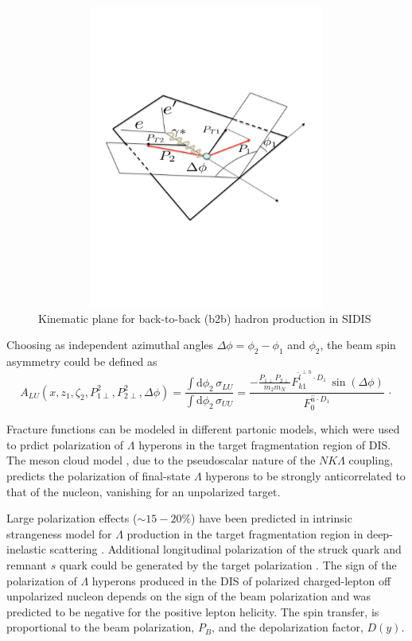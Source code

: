 \documentclass[11pt,a4paper]{article}
\newcommand{\be}{\begin{equation}}
\newcommand{\ee}{\end{equation}}
\newcommand{\D}{\mathrm{d}}
\begin{document}
\begin{figure}
\centering
\includegraphics[width=16cm,height=10cm,keepaspectratio]{plots/b2bkin.pdf}
   \caption{Kinematic plane for back-to-back (b2b) hadron production in SIDIS}
 \label{fig:b2b}
 \end{figure} 


Choosing as independent azimuthal angles $\Delta \phi=\phi_2-\phi_1$ and $\phi_2$, the beam spin asymmetry could be defined as
\be
A_{LU}(x, z_1, \zeta_2, P_{1\perp}^2,  P_{2\perp}^2, \Delta \phi) =
\frac{\int \D \phi_2 \, \sigma_{LU}}{\int \D \phi_2 \, \sigma_{UU}}=
\frac{-\frac{ P_{{1\perp}} P_{{2\perp}}}{m_2 m_N}  F_{{k1}}^{{\hat l}^{\perp h}\cdot D_1} \, \sin(\Delta \phi)}{F_0^{{\hat u} \cdot D_1}}\,\cdot
\ee


Fracture functions can be modeled in different partonic models, which were used
to prdict  polarization of $\Lambda$ hyperons in the target fragmentation
region of DIS. The meson cloud model
\cite{Melnitchouk:1995en}, due to the pseudoscalar nature of the $N K \Lambda$ coupling,
predicts the polarization of final-state $\Lambda$ hyperons to be
strongly anticorrelated to that of the nucleon, vanishing for an
unpolarized target.

Large polarization effects ($\sim 15-20\%$) 
have been predicted in intrinsic strangeness model for $\Lambda$
production in the target fragmentation region in deep-inelastic
scattering \cite{Alberg:1995zp,Ellis:1994ww}.
Additional longitudinal polarization of the struck quark 
and remnant $s$ quark could be generated by the 
target polarization \cite{Ellis:1995fc}.
The sign of the polarization of $\Lambda$ hyperons produced in 
the DIS of polarized
charged-lepton off unpolarized nucleon depends on the sign of the
beam polarization and was predicted to be negative for the positive
lepton helicity. The spin transfer, is proportional to the
beam polarization, $P_B$, and the depolarization factor, $D(y)$.
\end{document}

